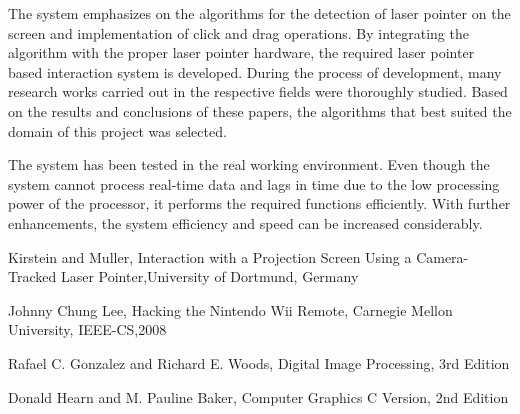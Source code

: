 \documentclass[12pt, a4paper]{article}
\begin{document}
   The system emphasizes on the algorithms for the detection of laser pointer on the screen and implementation of click  and drag operations. By integrating the algorithm with the proper laser pointer hardware, the required laser pointer based interaction system is developed. During the process of development, many research works carried out in the respective fields were thoroughly studied. Based on the results and conclusions of these papers, the algorithms that best suited the domain of this project was selected.
   
   The system has been tested in the real working environment. Even though the system cannot process real-time data and lags in time due to the low processing power of the processor, it performs the required functions efficiently. With further enhancements, the system efficiency and speed can be increased considerably. 
   
\newpage
\renewcommand{\refname}{REFERENCES}
\begin{thebibliography}{}
	 Kirstein and Muller, Interaction with a Projection Screen Using a Camera-Tracked Laser Pointer,University of Dortmund, Germany 
	

	 Johnny Chung Lee, Hacking the Nintendo Wii Remote, Carnegie 		   Mellon University, IEEE-CS,2008 

	
	 Rafael C. Gonzalez and Richard E. Woods, Digital Image Processing, 3rd Edition
	
	 Donald Hearn and M. Pauline Baker, Computer Graphics C Version, 2nd Edition 
\end{thebibliography}
\end{document}
